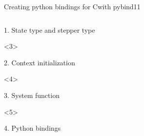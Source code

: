 \documentclass[@BEAMER_OPTIONS@]{beamer}
\newcommand{\CXX}{{\rm C}\plusplus}
\begin{document}
\begin{frame}[fragile]{Creating python bindings for \CXX with pybind11}
\begin{columns}
\begin{column}[c]{0.6\textwidth}
\begin{onlyenv}
\begin{exampleblock}{1. State type and stepper type}
                    \begin{adjustbox}{width=0.6\textwidth, height=\textheight, keepaspectratio}
                        \begin{minipage}{\textwidth}
                            
                        \end{minipage}
                    \end{adjustbox}
                \end{exampleblock}
            \end{onlyenv}
            \begin{onlyenv}<3>
                \begin{exampleblock}{2. Context initialization}
                    \begin{adjustbox}{width=0.6\textwidth, height=\textheight, keepaspectratio}
                        \begin{minipage}{\textwidth}
                            
                        \end{minipage}
                    \end{adjustbox}
                \end{exampleblock}
            \end{onlyenv}
            \begin{onlyenv}<4>
                \begin{exampleblock}{3. System function}
                    \begin{adjustbox}{width=0.6\textwidth, height=\textheight, keepaspectratio}
                        \begin{minipage}{\textwidth}
                            
                        \end{minipage}
                    \end{adjustbox}
                \end{exampleblock}
            \end{onlyenv}
            \begin{onlyenv}<5>
                \begin{exampleblock}{4. Python bindings}
                    \begin{adjustbox}{width=0.6\textwidth, height=\textheight, keepaspectratio}
                        \begin{minipage}{\textwidth}

\end{minipage}
\end{adjustbox}
\end{exampleblock}
\end{onlyenv}
\end{column}
\end{columns}
\end{frame}
\end{document}
